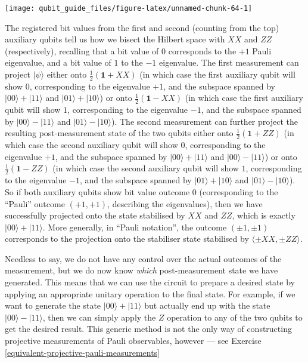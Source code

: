 \documentclass[fleqn,a4paper]{article}
\theoremstyle{definition}
\theoremstyle{definition}
\theoremstyle{definition}
\theoremstyle{definition}
\theoremstyle{remark}
\begin{document}
\begin{center}\texttt{[image: qubit\_guide\_files/figure-latex/unnamed-chunk-64-1]} \end{center}

The registered bit values from the first and second (counting from the top) auxiliary qubits tell us how we bisect the Hilbert space with \(XX\) and \(ZZ\) (respectively), recalling that a bit value of \(0\) corresponds to the \(+1\) Pauli eigenvalue, and a bit value of \(1\) to the \(-1\) eigenvalue.
The first measurement can project \(|\psi\rangle\) either onto \(\frac{1}{2}(\mathbf{1}+XX)\) (in which case the first auxiliary qubit will show \(0\), corresponding to the eigenvalue \(+1\), and the subspace spanned by \(|00\rangle+|11\rangle\) and \(|01\rangle+|10\rangle\)) or onto \(\frac{1}{2}(\mathbf{1}-XX)\) (in which case the first auxiliary qubit will show \(1\), corresponding to the eigenvalue \(-1\), and the subspace spanned by \(|00\rangle-|11\rangle\) and \(|01\rangle-|10\rangle\)).
The second measurement can further project the resulting post-measurement state of the two qubits either onto \(\frac{1}{2}(\mathbf{1}+ZZ)\) (in which case the second auxiliary qubit will show \(0\), corresponding to the eigenvalue \(+1\), and the subspace spanned by \(|00\rangle+|11\rangle\) and \(|00\rangle-|11\rangle\)) or onto \(\frac{1}{2}(\mathbf{1}-ZZ)\) (in which case the second auxiliary qubit will show \(1\), corresponding to the eigenvalue \(-1\), and the subspace spanned by \(|01\rangle+|10\rangle\) and \(|01\rangle-|10\rangle\)).
So if both auxiliary qubits show bit value outcome \(0\) (corresponding to the ``Pauli'' outcome \((+1,+1)\), describing the eigenvalues), then we have successfully projected onto the state stabilised by \(XX\) and \(ZZ\), which is exactly \(|00\rangle+|11\rangle\).
More generally, in ``Pauli notation'', the outcome \((\pm1,\pm1)\) corresponds to the projection onto the stabiliser state stabilised by \(\langle\pm XX,\pm ZZ\rangle\).

Needless to say, we do not have any control over the actual outcomes of the measurement, but we do now know \emph{which} post-measurement state we have generated.
This means that we can use the circuit to prepare a desired state by applying an appropriate unitary operation to the final state.
For example, if we want to generate the state \(|00\rangle+|11\rangle\) but actually end up with the state \(|00\rangle-|11\rangle\), then we can simply apply the \(Z\) operation to any of the two qubits to get the desired result.
This generic method is not the only way of constructing projective measurements of Pauli observables, however --- see Exercise \ref{equivalent-projective-pauli-measurements}
\end{document}
